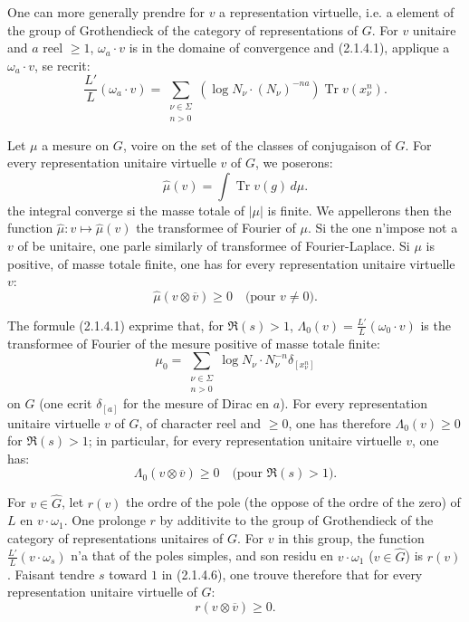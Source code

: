 \documentclass[12pt,a4paper]{article}
\theoremstyle{plain}
\theoremstyle{definition}
\theoremstyle{remark}
\DeclareMathOperator{\Tr}{Tr}
\begin{document}
One can more generally prendre for $v$ a representation virtuelle, i.e. a element of the group of Grothendieck of the category of representations of $G$. For $v$ unitaire and $a$ reel $\geq 1$, $\omega_a \cdot v$ is in the domaine of convergence and (2.1.4.1), applique a $\omega_a \cdot v$, se recrit:
\begin{equation}\label{eq:2.1.4.2}
\frac{L'}{L}(\omega_a \cdot v) = \sum_{\substack{\nu \in \Sigma \\ n > 0}} (\log N_\nu \cdot (N_\nu)^{-na}) \Tr v(x_\nu^n).
\end{equation}

Let $\mu$ a mesure on $G$, voire on the set of the classes of conjugaison of $G$. For every representation unitaire virtuelle $v$ of $G$, we poserons:
\begin{equation}\label{eq:2.1.4.3}
\widehat{\mu}(v) = \int \Tr v(g)\, d\mu.
\end{equation}
the integral converge si the masse totale of $|\mu|$ is finite. We appellerons then the function $\widehat{\mu} : v \mapsto \widehat{\mu}(v)$ the transformee of Fourier of $\mu$. Si the one n'impose not a $v$ of be unitaire, one parle similarly of transformee of Fourier-Laplace. Si $\mu$ is positive, of masse totale finite, one has for every representation unitaire virtuelle $v$:
\begin{equation}\label{eq:2.1.4.4}
\widehat{\mu}(v \otimes \overline{v}) \geq 0 \quad \text{(pour } v \neq 0 \text{)}.
\end{equation}

The formule (2.1.4.1) exprime that, for $\Re(s) > 1$, $\Lambda_0(v) = \frac{L'}{L}(\omega_0 \cdot v)$ is the transformee of Fourier of the mesure positive of masse totale finite:
\begin{equation}\label{eq:2.1.4.5}
\mu_0 = \sum_{\substack{\nu \in \Sigma \\ n > 0}} \log N_\nu \cdot N_\nu^{-n} \delta_{[x_\nu^n]}
\end{equation}
on $G$ (one ecrit $\delta_{[a]}$ for the mesure of Dirac en $a$). For every representation unitaire virtuelle $v$ of $G$, of character reel and $\geq 0$, one has therefore $\Lambda_0(v) \geq 0$ for $\Re(s) > 1$; in particular, for every representation unitaire virtuelle $v$, one has:
\begin{equation}\label{eq:2.1.4.6}
\Lambda_0(v \otimes \overline{v}) \geq 0 \quad \text{(pour } \Re(s) > 1 \text{)}.
\end{equation}

For $v \in \widehat{G}$, let $r(v)$ the ordre of the pole (the oppose of the ordre of the zero) of $L$ en $v \cdot \omega_1$. One prolonge $r$ by additivite to the group of Grothendieck of the category of representations unitaires of $G$. For $v$ in this group, the function $\frac{L'}{L}(v \cdot \omega_s)$ n'a that of the poles simples, and son residu en $v \cdot \omega_1$ ($v \in \widehat{G}$) is $r(v)$. Faisant tendre $s$ toward $1$ in (2.1.4.6), one trouve therefore that for every representation unitaire virtuelle of $G$:
\[ r(v \otimes \overline{v}) \geq 0. \]
\end{document}
